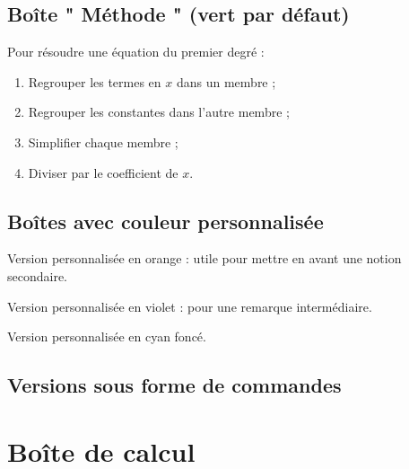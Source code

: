 \documentclass[11pt,a4paper]{article}
\begin{document}
\subsection{Boîte " Méthode " (vert par défaut)}

\begin{methode}
    Pour résoudre une équation du premier degré :
    \begin{enumerate}
        \item Regrouper les termes en $x$ dans un membre ;
        \item Regrouper les constantes dans l'autre membre ;
        \item Simplifier chaque membre ;
        \item Diviser par le coefficient de $x$.
    \end{enumerate}
\end{methode}

\subsection{Boîtes avec couleur personnalisée}

\begin{retenir}[orange]
    Version personnalisée en orange : utile pour mettre en avant une
    notion secondaire.
\end{retenir}

\begin{vigilance}[purple]
    Version personnalisée en violet : pour une remarque intermédiaire.
\end{vigilance}

\begin{methode}
    Version personnalisée en cyan foncé.
\end{methode}

\subsection{Versions sous forme de commandes}




\section{Boîte de calcul}
\end{document}
